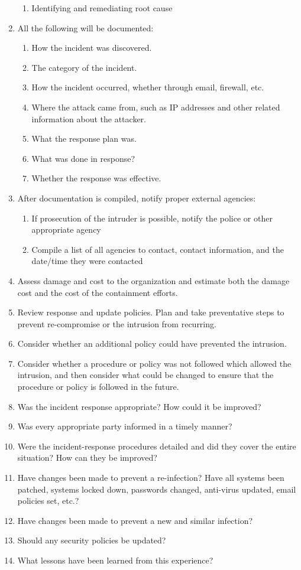 \documentclass[../main.tex]{subfiles}
\begin{document}
\begin{enumerate}
\begin{enumerate}
        \item Identifying and remediating root cause
    \end{enumerate}
    \item All the following will be documented:
    \begin{enumerate}
        \item How the incident was discovered.
        \item The category of the incident.
        \item How the incident occurred, whether through email, firewall, etc.
        \item Where the attack came from, such as IP addresses and other related information about the attacker.
        \item What the response plan was.
        \item What was done in response?
        \item Whether the response was effective.
    \end{enumerate}
    \item After documentation is compiled, notify proper external agencies:
    \begin{enumerate}
        \item If prosecution of the intruder is possible, notify the police or other appropriate agency
        \item Compile a list of all agencies to contact, contact information, and the date/time they were contacted
    \end{enumerate}
    \item Assess damage and cost to the organization and estimate both the damage cost and the cost of the containment efforts.
    \item Review response and update policies. Plan and take preventative steps to prevent re-compromise or the intrusion from recurring.
    \item Consider whether an additional policy could have prevented the intrusion.
    \item Consider whether a procedure or policy was not followed which allowed the intrusion, and then consider what could be changed to ensure
    that the procedure or policy is followed in the future.
    \item Was the incident response appropriate? How could it be improved?
    \item Was every appropriate party informed in a timely manner?
    \item Were the incident-response procedures detailed and did they cover the entire situation? How can they be improved?
    \item Have changes been made to prevent a re-infection? Have all systems been patched, systems locked down, passwords changed, anti-virus updated,
    email policies set, etc.?
    \item Have changes been made to prevent a new and similar infection?
    \item Should any security policies be updated?
    \item What lessons have been learned from this experience?

\end{enumerate}
\end{document}
